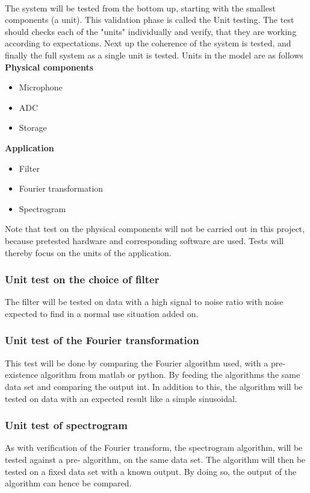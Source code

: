 \\
The system will be tested from the bottom up, starting with the smallest components (a unit). This validation phase is called the Unit testing. The test should checks each of the "units" individually and verify, that they are working according to expectations. Next up the coherence of the system is tested, and finally the full system as a single unit is tested. Units in the model are as follows \\
\textbf{Physical components }  
\begin{itemize}
	\item Microphone
	\item ADC
	\item Storage
\end{itemize}
\textbf{Application}
\begin{itemize}
	\item Filter
	\item Fourier transformation
	\item Spectrogram
\end{itemize}
Note that test on the physical components will not be carried out in this project, because pretested hardware and corresponding software are used. Tests will thereby focus on the units of the application.\\ 
\subsubsection{Unit test on the choice of filter}
The filter will be tested on data with a high signal to noise ratio with noise expected to find in a normal use situation added on.
\subsubsection{Unit test of the Fourier transformation}
This test will be done by comparing the Fourier algorithm used, with a pre-existence algorithm from matlab or python.
By feeding the algorithms the same data set and comparing the output int. 
In addition to this, the algorithm will be tested on data with an expected result like a simple sinusoidal.
\subsubsection{Unit test of spectrogram}
As with verification of the Fourier transform, the spectrogram algorithm, will be tested against a pre- algorithm, on the same data set.
The algorithm will then be tested on a fixed data set with a known output.
By doing so, the output of the algorithm can hence be compared.
